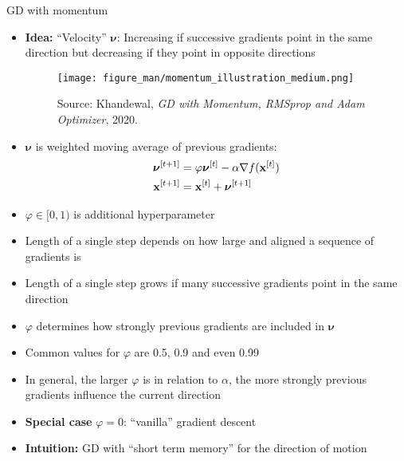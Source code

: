 \documentclass[11pt,compress,t,notes=noshow, xcolor=table]{beamer}
\begin{document}
\begin{vbframe}{GD with momentum}

\begin{itemize}
    \item \textbf{Idea:} \enquote{Velocity} $\bm{\nu}$: Increasing if successive gradients point in the same direction but decreasing if they point in opposite directions

    \begin{figure}
    	\texttt{[image: figure\_man/momentum\_illustration\_medium.png]} \\
    	\begin{footnotesize}
    	Source: Khandewal, \emph{GD with Momentum, RMSprop and Adam Optimizer}, 2020. 
    	\end{footnotesize}
    \end{figure}
    
    \item $\bm{\nu}$ is weighted moving average of previous gradients:
    \begin{align*}
        \bm{\nu}^{[t+1]} &= \varphi \bm{\nu}^{[t]} - \alpha \nabla f(\mathbf{x}^{[t]}) \\
        \mathbf{x}^{[t+1]} &= \mathbf{x}^{[t]} + \bm{\nu}^{[t+1]}
    \end{align*}
    \item $\varphi \in [0,1)$ is additional hyperparameter
\end{itemize}

\framebreak

\begin{itemize}
    \item Length of a single step depends on how large and aligned a sequence of gradients is
    \item Length of a single step grows if many successive gradients point in the same direction
    \item $\varphi$ determines how strongly previous gradients are included in $\bm{\nu}$
    \item Common values for $\varphi$ are 0.5, 0.9 and even 0.99
    \item In general, the larger $\varphi$ is in relation to $\alpha$, the more strongly previous gradients influence the current direction
    \item \textbf{Special case} $\varphi = 0$: \enquote{vanilla} gradient descent
    \item \textbf{Intuition:} GD with \enquote{short term memory} for the direction of motion
\end{itemize}


\end{vbframe}
\end{document}
